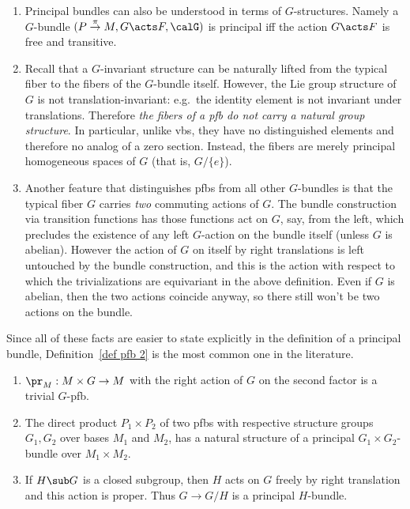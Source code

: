\begin{rem}
    \begin{enumerate}
        \item Principal bundles can also be understood in terms of $G$-structures. Namely a $G$-bundle $(P\overset{\pi}{\to}M,G\acts F,\calG)$ is principal iff the action $G\acts F$ is free and transitive. 
        
        \item Recall that a $G$-invariant structure can be naturally lifted from the typical fiber to the fibers of the $G$-bundle itself. However, the Lie group structure of $G$ is not translation-invariant: e.g.\ the identity element is not invariant under translations. Therefore \emph{the fibers of a \gls{pfb} do not carry a natural group structure}. In particular, unlike \glspl{vb}, they have no distinguished elements and therefore no analog of a zero section. Instead, the fibers are merely principal homogeneous spaces of $G$ (that is, $G\slash \{e\}$).

        \item Another feature that distinguishes \glspl{pfb} from all other $G$-bundles is that the typical fiber $G$ carries \emph{two} commuting actions of $G$. The bundle construction via transition functions has those functions act on $G$, say, from the left, which precludes the existence of any left $G$-action on the bundle itself (unless $G$ is abelian). However the action of $G$ on itself by right translations is left untouched by the bundle construction, and this is the action with respect to which the trivializations are equivariant in the above definition. Even if $G$ is abelian, then the two actions coincide anyway, so there still won't be two actions on the bundle.
    \end{enumerate}
    Since all of these facts are easier to state explicitly in the definition of a principal bundle, Definition~\ref{def pfb 2} is the most common one in the literature.
\end{rem}




\begin{example}
    \begin{enumerate}
        \item $\pr_M:M\times G\to M$ with the right action of $G$ on the second factor is a trivial $G$-\gls{pfb}.
        \item The direct product $P_1\times P_2$ of two \glspl{pfb} with respective structure groups $G_1,G_2$ over bases $M_1$ and $M_2$, has a natural structure of a principal $G_1\times G_2$-bundle over $M_1\times M_2$.
        \item If $H\sub G$ is a closed subgroup, then $H$ acts on $G$ freely by right translation and this action is proper. Thus $G\to G\slash H$ is a principal $H$-bundle.
    \end{enumerate}
\end{example}

